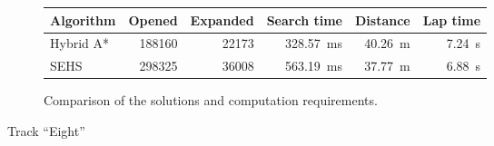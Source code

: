 \begin{figure}[!tbp]
	\vspace{0.75cm}

	\begin{subfigure}[t]{\textwidth}
		\centering
		\begin{tabular}{l r r r r r}%
			\toprule
			Algorithm & Opened & Expanded & Search time & Distance & Lap time \\
			\midrule
			Hybrid A* & \bftab \num{188160} & \bftab \num{22173} & \bftab \SI{328.57}{\milli\second} & \SI{40.26}{\meter} & \SI{7.24}{\second} \\
			SEHS & \num{298325} & \num{36008} & \SI{563.19}{\milli\second} & \bftab \SI{37.77}{\meter} & \bftab \SI{6.88}{\second} \\
			\bottomrule
		\end{tabular}
		\caption{Comparison of the solutions and computation requirements.}
		\label{table:eight}
	\end{subfigure}

	\vspace{0.75cm}

	\caption{Track ``Eight''}
\end{figure}


